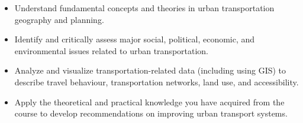 \documentclass[11pt]{article}
\begin{document}
	\begin{itemize}
		
		\item Understand fundamental concepts and theories in urban transportation geography and planning.
		
		\item Identify and critically assess major social, political, economic, and environmental issues related to urban transportation.
		
		\item Analyze and visualize transportation-related data (including using GIS) to describe travel behaviour, transportation networks, land use, and accessibility.
		
		\item Apply the theoretical and practical knowledge you have acquired from the course to develop recommendations on improving urban transport systems.
		
	\end{itemize}
	
	
	
	
	
	
	

	
	
	
	
%	
	
	
	
	
	
	
	
		
%		
\end{document}
